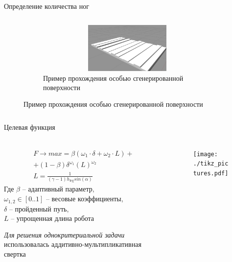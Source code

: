 \begin{frame}[t]{Определение количества ног}
\begin{columns}[T,onlytextwidth]
\begin{column}{0.39\textwidth}
\begin{figure}[H]
                \begin{subfigure}{0.99\textwidth}
                    \centering\includegraphics[height=2.5cm,width=1\textwidth,keepaspectratio]{../images/terrain_3.jpg}
                    \caption*{Пример прохождения особью сгенерированной поверхности}
                \end{subfigure}
            \end{figure}
        \end{column}
    \end{columns}
\end{frame}

\begin{frame}[t]{Целевая функция}
    \framesubtitle{}
    \vspace{-0.4cm}
    \begin{columns}[T,onlytextwidth]
        \begin{column}{0.48\textwidth}
            \begin{eqnarray}
                F \rightarrow max = \beta \left( {\omega}_{1} \cdot \delta + {\omega}_{2} \cdot L\right) + \\ \nonumber + (1 - \beta) {\delta}^{{\omega}_{1}} {\left( L\right)}^{{\omega}_{2}} \\
                L = \frac{1}{(\gamma - 1) h_{\text{leg}}sin(\alpha)}
            \end{eqnarray}
            Где
            $\beta$ -- адаптивный параметр, \\ ${\omega}_{1,2} \in  [ 0..1 ] $ -- весовые коэффициенты, \\
            $\delta$ -- пройденный путь, \\
            $L$ -- упрощенная длина робота

            \textit{Для решения однокритериальной задачи} использовалась аддитивно-мультипликативная свертка
        \end{column}
        \begin{column}{0.50\textwidth}
            \begin{figure}[H]
                \centering
                \centering\texttt{[image: ./tikz\_pictures.pdf]}
            \end{figure}
        \end{column}
    \end{columns}
\end{frame}


